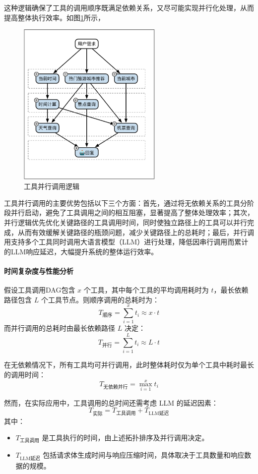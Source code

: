 这种逻辑确保了工具的调用顺序既满足依赖关系，又尽可能实现并行化处理，从而提高整体执行效率。如图\ref{fig:parallel-invocation-logic}所示，

\begin{figure}[!htp]
  \centering
  \setlength{\abovecaptionskip}{10pt}
  \includegraphics[height=8cm]{../assets/ch4-并行调用模块.pdf}
  \caption{工具并行调用逻辑}
  \label{fig:parallel-invocation-logic}
\end{figure}

工具并行调用的主要优势包括以下三个方面：首先，通过将无依赖关系的工具分阶段并行启动，避免了工具调用之间的相互阻塞，显著提高了整体处理效率；其次，并行逻辑优先优化关键路径的工具调用时间，同时使独立路径上的工具可以并行完成，从而有效缓解关键路径的瓶颈问题，减少关键路径上的总耗时；最后，并行调用支持多个工具同时调用大语言模型（LLM）进行处理，降低因串行调用而累计的LLM响应延迟，大幅提升系统的整体运行效率。

\paragraph{时间复杂度与性能分析}

假设工具调用DAG包含 \(x\) 个工具，其中每个工具的平均调用耗时为 \(t\)，最长依赖路径包含 \(L\) 个工具节点。则顺序调用的总耗时为：
\[
T_{\text{顺序}} = \sum_{i=1}^{x} t_i \approx x \cdot t
\]
而并行调用的总耗时由最长依赖路径 \(L\) 决定：
\[
T_{\text{并行}} = \sum_{i=1}^{L} t_i \approx L \cdot t
\]

在无依赖情况下，所有工具均可并行调用，此时整体耗时仅为单个工具中耗时最长的调用时间：
\[
T_{\text{无依赖并行}} = \max_{i=1}^{x} t_i
\]

然而，在实际应用中，工具调用的总时间还需考虑 LLM 的延迟因素：
\[
T_{\text{实际}} = T_{\text{工具调用}} + T_{\text{LLM延迟}}
\]
其中：
\begin{itemize}
    \item \(T_{\text{工具调用}}\) 是工具执行的时间，由上述拓扑排序及并行调用决定。
    \item \(T_{\text{LLM延迟}}\) 包括请求体生成时间与响应压缩时间，具体取决于工具数量和响应数据的规模。
\end{itemize}

